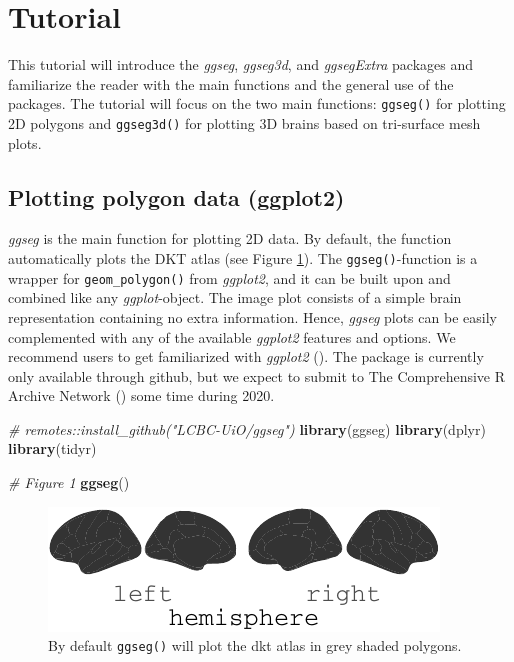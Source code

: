 \documentclass[fleqn,10pt]{wlpeerj} %
\newenvironment{Shaded}{\begin{snugshade}}{\end{snugshade}}
\newcommand{\CommentTok}[1]{\textcolor[rgb]{0.56,0.35,0.01}{\textit{#1}}}
\newcommand{\KeywordTok}[1]{\textcolor[rgb]{0.13,0.29,0.53}{\textbf{#1}}}
\newcommand{\NormalTok}[1]{#1}
\begin{document}
\hypertarget{tutorial}{%
\section{Tutorial}\label{tutorial}}

This tutorial will introduce the \emph{ggseg}, \emph{ggseg3d}, and \emph{ggsegExtra} packages and familiarize the reader with the main functions and the general use of the packages.
The tutorial will focus on the two main functions: \texttt{ggseg()} for plotting 2D polygons and \texttt{ggseg3d()} for plotting 3D brains based on tri-surface mesh plots.

\hypertarget{plotting-polygon-data-ggplot2}{%
\subsection{Plotting polygon data (ggplot2)}\label{plotting-polygon-data-ggplot2}}

\emph{ggseg} is the main function for plotting 2D data.
By default, the function automatically plots the DKT atlas (see Figure \ref{fig:init}).
The \texttt{ggseg()}-function is a wrapper for \texttt{geom\_polygon()} from \emph{ggplot2}, and it can be built upon and combined like any \emph{ggplot}-object.
The image plot consists of a simple brain representation containing no extra information.
Hence, \emph{ggseg} plots can be easily complemented with any of the available \emph{ggplot2} features and options.
We recommend users to get familiarized with \emph{ggplot2} (\citet{ggplot}).
The package is currently only available through github, but we expect to submit to The Comprehensive R Archive Network (\citet{cran}) some time during 2020.

\begin{Shaded}
\begin{Highlighting}[]
\CommentTok{\# remotes::install\_github("LCBC{-}UiO/ggseg")}
\KeywordTok{library}\NormalTok{(ggseg)}
\KeywordTok{library}\NormalTok{(dplyr)}
\KeywordTok{library}\NormalTok{(tidyr)}

\CommentTok{\# Figure 1}
\KeywordTok{ggseg}\NormalTok{()}
\end{Highlighting}
\end{Shaded}

\begin{figure}
\centering
\includegraphics{draft_2_files/figure-latex/init-1.pdf}
\caption{\label{fig:init}By default \texttt{ggseg()} will plot the dkt atlas in grey shaded polygons.}
\end{figure}
\end{document}

